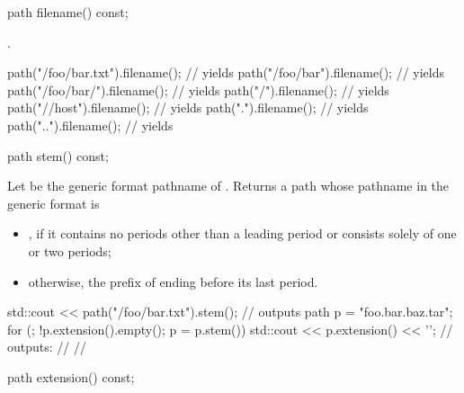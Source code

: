 %
\begin{itemdecl}
path filename() const;
\end{itemdecl}

\begin{itemdescr}
\pnum
\returns {}.

\pnum
\begin{example}
\begin{codeblock}
path("/foo/bar.txt").filename();   // yields 
path("/foo/bar").filename();       // yields 
path("/foo/bar/").filename();      // yields 
path("/").filename();              // yields 
path("//host").filename();         // yields 
path(".").filename();              // yields 
path("..").filename();             // yields 
\end{codeblock}
\end{example}
\end{itemdescr}

%
\begin{itemdecl}
path stem() const;
\end{itemdecl}

\begin{itemdescr}
\pnum
\returns Let  be the generic format pathname of .
Returns a path whose pathname in the generic format is
\begin{itemize}
\item {}, if it contains no periods other than a leading period
or consists solely of one or two periods;
\item otherwise, the prefix of  ending before its last period.
\end{itemize}

\pnum
\begin{example}
\begin{codeblock}
std::cout << path("/foo/bar.txt").stem(); // outputs 
path p = "foo.bar.baz.tar";
for (; !p.extension().empty(); p = p.stem())
  std::cout << p.extension() << '\n';
  // outputs: 
  //          
  //          
\end{codeblock}
\end{example}
\end{itemdescr}

%
\begin{itemdecl}
path extension() const;
\end{itemdecl}

